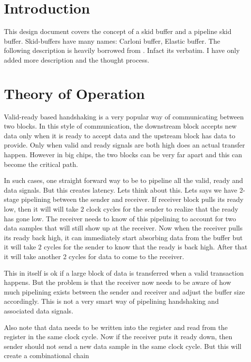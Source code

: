 
\section{Introduction}

This design document covers the concept of a skid buffer and a pipeline skid buffer. Skid-buffers have many names: Carloni buffer, Elastic buffer. The following description is heavily borrowed from \cite{fpgacpu_skidbuf}. Infact its verbatim. I have only added more description and the thought process.

\section{Theory of Operation}

Valid-ready based handshaking is a very popular way of communicating between two blocks. In this style of communication, the downstream block accepts new data only when it is ready to accept data and the upstream block has data to provide. Only when valid and ready signals are both high does an actual transfer happen. However in big chips, the two blocks can be very far apart and this can become the critical path.

In such cases, one straight forward way to be to pipeline all the valid, ready and data signals. But this creates latency. Lets think about this. Lets says we have $2$-stage pipelining between the sender and receiver. If receiver block pulls its ready low, then it will will take $2$ clock cycles for the sender to realize that the ready has gone low. The receiver needs to know of this pipelining to account for two data samples that will still show up at the receiver. Now when the receiver pulls its ready back high, it can immediately start absorbing data from the buffer but it will take $2$ cycles for the sender to know that the ready is back high. After that it will take another 2 cycles for data to come to the receiver. 

This in itself is ok if a large block of data is transferred when a valid transaction happens. But the problem is that the receiver now needs to be aware of how much pipelining exists between the sender and receiver and adjust the buffer size accordingly. This is not a very smart way of pipelining handshaking and associated data signals.

Also note that data needs to be written into the register and read from the register in the same clock cycle. Now if the receiver puts it ready down, then sender should not send a new data sample in the same clock cycle. But this will create a combinational chain

